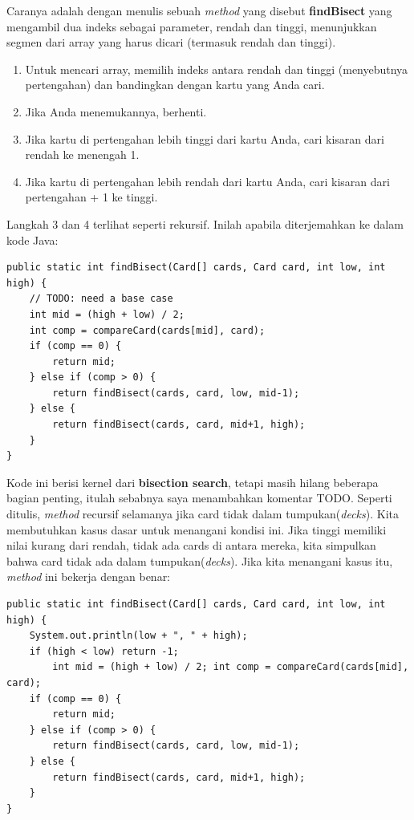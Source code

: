 \noindent Caranya adalah dengan menulis sebuah \textit{method} yang disebut \textbf{findBisect} yang mengambil dua indeks sebagai parameter, rendah dan tinggi, menunjukkan segmen dari array yang harus dicari (termasuk rendah dan tinggi).
\begin{enumerate}
    \item Untuk mencari array, memilih indeks antara rendah dan tinggi (menyebutnya pertengahan) dan bandingkan dengan kartu yang Anda cari.
    \item Jika Anda menemukannya, berhenti.
    \item Jika kartu di pertengahan lebih tinggi dari kartu Anda, cari kisaran dari rendah ke menengah 1.
    \item Jika kartu di pertengahan lebih rendah dari kartu Anda, cari kisaran dari pertengahan + 1 ke tinggi.
\end{enumerate}

\noindent Langkah 3 dan 4 terlihat seperti rekursif. 
Inilah apabila diterjemahkan ke dalam kode Java:

\begin{lstlisting}
public static int findBisect(Card[] cards, Card card, int low, int high) {
    // TODO: need a base case 
    int mid = (high + low) / 2; 
    int comp = compareCard(cards[mid], card);
    if (comp == 0) { 
        return mid; 
    } else if (comp > 0) { 
        return findBisect(cards, card, low, mid-1); 
    } else { 
        return findBisect(cards, card, mid+1, high); 
    }
}
\end{lstlisting}

\noindent Kode ini berisi kernel dari \textbf{bisection search}, tetapi masih hilang beberapa bagian penting, itulah sebabnya saya menambahkan komentar TODO. Seperti ditulis, \textit{method} recursif selamanya jika card tidak dalam tumpukan(\textit{decks}). Kita membutuhkan kasus dasar untuk menangani kondisi ini.
Jika tinggi memiliki nilai kurang dari rendah, tidak ada cards di antara mereka, kita simpulkan bahwa card tidak ada dalam tumpukan(\textit{decks}). Jika kita menangani kasus itu, \textit{method} ini bekerja dengan benar:
\begin{lstlisting}
public static int findBisect(Card[] cards, Card card, int low, int high) { 
    System.out.println(low + ", " + high);
    if (high < low) return -1;
        int mid = (high + low) / 2; int comp = compareCard(cards[mid], card);
    if (comp == 0) { 
        return mid;
    } else if (comp > 0) { 
        return findBisect(cards, card, low, mid-1); 
    } else { 
        return findBisect(cards, card, mid+1, high); 
    }
}
\end{lstlisting}

